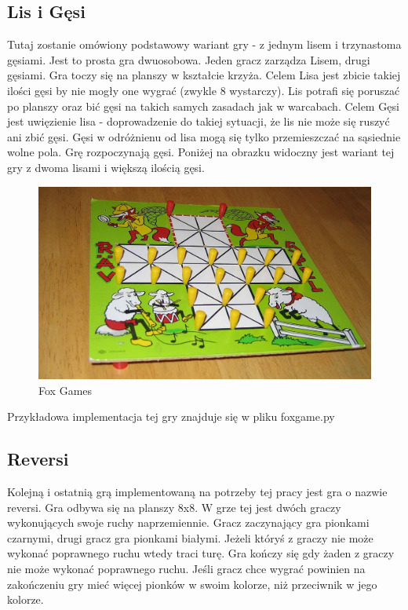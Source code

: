 \documentclass[polish,shortabstract,inz]{iithesis}
\begin{document}
\subsection{Lis i Gęsi}
Tutaj zostanie omówiony podstawowy wariant gry - z jednym lisem i trzynastoma gęsiami.
Jest to prosta gra dwuosobowa. Jeden gracz zarządza Lisem, drugi gęsiami.
Gra toczy się na planszy w kształcie krzyża.
Celem Lisa jest zbicie takiej ilości gęsi by nie mogły one wygrać (zwykle 8 wystarczy).
Lis potrafi się poruszać po planszy oraz bić gęsi na takich samych zasadach jak w warcabach.
Celem Gęsi jest uwięzienie lisa - doprowadzenie do takiej sytuacji, że lis nie może się ruszyć ani zbić gęsi.
Gęsi w odróżnienu od lisa mogą się tylko przemieszczać na sąsiednie wolne pola.
Grę rozpoczynają gęsi.
Poniżej na obrazku widoczny jest wariant tej gry z dwoma lisami i większą ilością gęsi.
\begin{figure}[H]
  \includegraphics[scale=0.25]{./images/foxgames.jpg}
  \centering
  \caption{Fox Games}
  \label{fig:fg}
\end{figure}

Przykładowa implementacja tej gry znajduje się w pliku fox\textunderscore game.py

\subsection{Reversi}
Kolejną i ostatnią grą implementowaną na potrzeby tej pracy jest gra o nazwie reversi.
Gra odbywa się na planszy 8x8.
W grze tej jest dwóch graczy wykonujących swoje ruchy naprzemiennie.
Gracz zaczynający gra pionkami czarnymi, drugi gracz gra pionkami białymi.
Jeżeli któryś z graczy nie może wykonać poprawnego ruchu wtedy traci turę.
Gra kończy się gdy żaden z graczy nie może wykonać poprawnego ruchu.
Jeśli gracz chce wygrać powinien na zakończeniu gry mieć więcej pionków w swoim kolorze, niż przeciwnik w jego kolorze.
\end{document}
